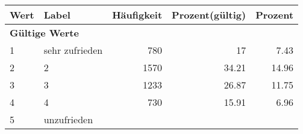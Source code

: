      \begin{longtable}{lXrrr}
     \toprule
     \textbf{Wert} & \textbf{Label} & \textbf{Häufigkeit} & \textbf{Prozent(gültig)} & \textbf{Prozent} \\
     \endhead
     \midrule
     \multicolumn{5}{l}{\textbf{Gültige Werte}}\\

     1 &
     \multicolumn{1}{X}{ sehr zufrieden   } &


       \num{780} &
       \num[round-mode=places,round-precision=2]{17} &
         \num[round-mode=places,round-precision=2]{7.43} \\

     2 &
     \multicolumn{1}{X}{ 2   } &


       \num{1570} &
       \num[round-mode=places,round-precision=2]{34.21} &
         \num[round-mode=places,round-precision=2]{14.96} \\

     3 &
     \multicolumn{1}{X}{ 3   } &


       \num{1233} &
       \num[round-mode=places,round-precision=2]{26.87} &
         \num[round-mode=places,round-precision=2]{11.75} \\

     4 &
     \multicolumn{1}{X}{ 4   } &


       \num{730} &
       \num[round-mode=places,round-precision=2]{15.91} &
         \num[round-mode=places,round-precision=2]{6.96} \\

     5 &
     \multicolumn{1}{X}{ unzufrieden   } &



\end{longtable}
